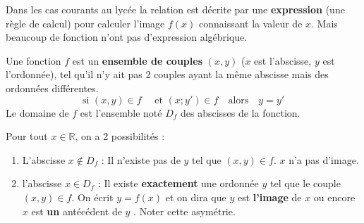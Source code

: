 \documentclass[main.tex]{subfiles}
\begin{document}
Dans les cas courants au lycée la relation est décrite par une \textbf{expression} (une règle de calcul) pour calculer l'image $f(x)$ connaissant la valeur de  $x$. Mais beaucoup de fonction n'ont pas d'expression algébrique. 
\begin{definition} 
	Une fonction $f$ est un \textbf{ensemble de couples} $(x,y)$ ($x$ est l'abscisse, $y$ est l'ordonnée), tel qu'il n'y ait pas 2 couples  ayant la même abscisse mais des ordonnées différentes.
	\setlength{\abovedisplayskip}{3pt}
	\setlength{\belowdisplayskip}{3pt}  
	$$\text{si }   (x,y)\in f\quad \text{ et } (x;y')\in f\quad \text{alors} \quad y=y'$$ 
	Le domaine de $f$ est l'ensemble noté $D_f$ des abscisses de la fonction.  
\end{definition}
Pour tout $x\in\mathbb{R}$, on a 2 possibilités :
\begin{enumerate}[label=\textbullet, leftmargin=*]
	\item L'abscisse $x\notin D_f$ : Il n'existe pas de $y$ tel que $(x,y)\in f$. $x$ n'a pas d'image. 
	\item l'abscisse $x\in D_f$ :  Il existe \textbf{exactement} une  ordonnée $y$  tel que le couple $(x,y)\in f$. On écrit $y=f(x)$ et on dira que \og $y$ est \textbf{l'image} de $x$ \fg{} ou encore \og $x$ est \textbf{un} antécédent de $y$  \fg{}. Noter cette asymétrie.
	
\end{enumerate} 
\end{document}
